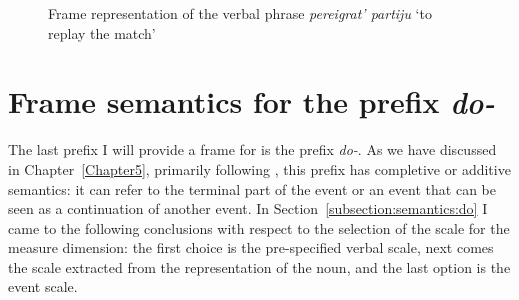 \begin{figure}\small
{}
\caption{Frame representation of the verbal phrase \textit{pereigrat' partiju} `to replay the match' \label{frame:pere:igrat:match}}
\end{figure}

\clearpage

\section{Frame semantics for the prefix \textit{do-}}\label{section:frame:do}
The last prefix I will provide a frame for is the prefix \textit{do-}. As we have discussed in Chapter~\ref{Chapter5}, primarily following \citet{Kagan:book}, this prefix has completive or additive semantics: it can refer to the terminal part of the event or an event that can be seen as a continuation of another event. In Section~\ref{subsection:semantics:do} I came to the following conclusions with respect to the selection of the scale for the measure dimension: the first choice is the pre-specified verbal scale, next comes the scale extracted from the representation of the noun, and the last option is the event scale. 

